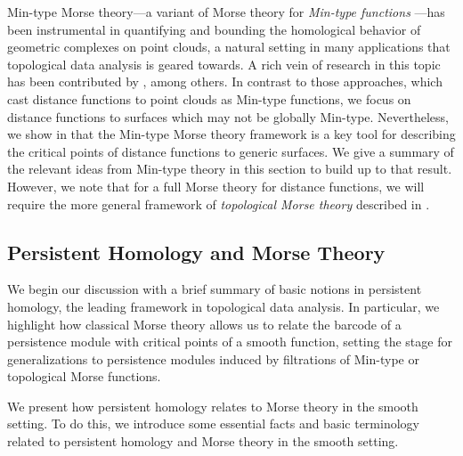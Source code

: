 \documentclass[11pt]{article}
\theoremstyle{plain}
\theoremstyle{definition}
\theoremstyle{remark}
\begin{document}
Min-type Morse theory---a variant of Morse theory for \emph{Min-type functions} \citep{gershkovich_morse_1997}---has been instrumental in quantifying and bounding the homological behavior of geometric complexes on point clouds, a natural setting in many applications that topological data analysis is geared towards. A rich vein of research in this topic has been contributed by \cite{bobrowski_distance_2014,bobrowski2017vanishing,bobrowski2019random,de2022random}, among others. In contrast to those approaches, which cast distance functions to point clouds as Min-type functions, we focus on distance functions to surfaces which may not be globally Min-type. Nevertheless, we show in  that the Min-type Morse theory framework is a key tool for describing the critical points of distance functions to generic surfaces. We give a summary of the relevant ideas from Min-type theory in this section to build up to that result. However, we note that for a full Morse theory for distance functions, we will require the more general framework of \emph{topological Morse theory} described in .


\subsection{Persistent Homology and Morse Theory}
\label{sec:PH_and_Morse_theory}

We begin our discussion with a brief summary of basic notions in persistent homology, the leading framework in topological data analysis. In particular, we highlight how classical Morse theory allows us to relate the barcode of a persistence module with critical points of a smooth function, setting the stage for generalizations to persistence modules induced by filtrations of Min-type or topological Morse functions. 

We present how persistent homology relates to Morse theory in the  smooth setting. To do this, we introduce some essential facts and basic terminology related to persistent homology and Morse theory in the smooth setting.
\end{document}

